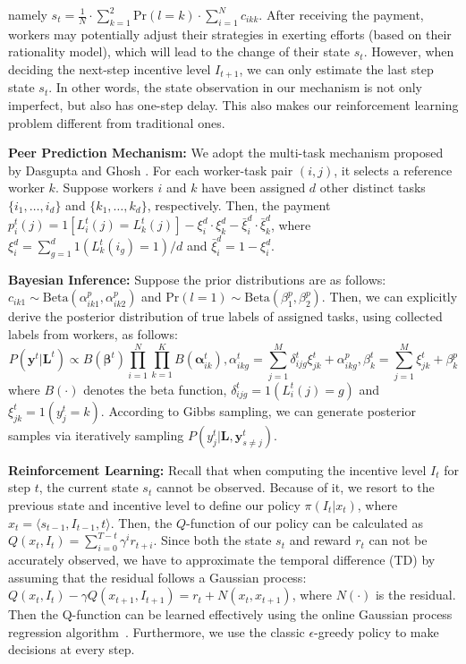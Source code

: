 \documentclass{article}
\begin{document}
namely $s_t =\frac{1}{N}\cdot \sum_{k=1}^2\textrm{Pr}(l=k)\cdot  \sum_{i=1}^{N}c_{ikk}$.
After receiving the payment, workers may potentially adjust their strategies in exerting efforts (based on their rationality model), which will lead to the change of their state $s_t$.
However, when deciding the next-step incentive level $I_{t+1}$, we can only estimate the last step state $s_t$.
In other words, the state observation in our mechanism is not only imperfect, but also has one-step delay. This also makes our reinforcement learning problem different from traditional ones.

\noindent \textbf{Peer Prediction Mechanism:} We adopt the multi-task mechanism proposed by Dasgupta and Ghosh \cite{dasgupta2013crowdsourced}.  For each worker-task pair $(i, j)$, it selects a reference worker $k$. Suppose workers $i$ and $k$ have been assigned $d$ other distinct tasks $\{i_1,\ldots,i_d\}$ and $\{k_1,\ldots, k_d\}$, respectively. Then, the payment $p^t_{i}(j)= 1[L^{t}_i(j)=L^{t}_k(j)]- \xi_{i}^d\cdot \xi_{k}^d -\bar{\xi}_{i}^d\cdot \bar{\xi}_{k}^d$, where $\xi_{i}^{d}=\sum_{g=1}^{d}1(L^{t}_k(i_g)=1)/d$ and $\bar{\xi}_{i}^{d}=1-\xi_{i}^{d}$.

\noindent \textbf{Bayesian Inference:} Suppose the prior distributions are as follows: $c_{ik1}\sim \textrm{Beta}(\alpha^{p}_{ik1},\alpha^{p}_{ik2})$ and $\textrm{Pr}(l=1)\sim \textrm{Beta}(\beta^{p}_{1},\beta^{p}_{2})$. Then, we can explicitly derive the posterior distribution of true labels of assigned tasks, using collected labels from workers, as follows:
\begin{equation}
\label{PostDist}
P(\bm{y}^{t}|\bm{L}^{t})\propto B(\bm{\beta}^{t}){\prod}_{i=1}^{N}{\prod}_{k=1}^{K} B(\bm{\alpha}^{t}_{ik}), \alpha^{t}_{ikg}={\sum}_{j=1}^{M}\delta^{t}_{ijg}\xi^{t}_{jk}+\alpha^{p}_{ikg}, \beta^{t}_k={\sum}_{j=1}^{M}\xi^{t}_{jk}+\beta^{p}_{k}
\end{equation}
where $B(\cdot)$ denotes the beta function, $\delta^{t}_{ijg}=1(L^t_i(j)=g)$ and $\xi^{t}_{jk}= 1(y^{t}_j=k)$. According to Gibbs sampling, we can generate posterior samples via iteratively sampling $P(y^{t}_j|\bm{L}, \bm{y}^t_{s\neq j})$.

\noindent \textbf{Reinforcement Learning:} Recall that when computing the incentive level $I_{t}$ for step $t$, the current state $s_{t}$ cannot be observed. Because of it, we resort to the previous state and incentive level to define our  policy $\pi(I_{t}|x_t)$, where $x_t=\langle s_{t-1}, I_{t-1}, t \rangle$.
Then, the $Q$-function of our policy can be calculated as $Q(x_t, I_t)= \sum_{i=0}^{T-t} \gamma^{i} r_{t+i}$.  %
Since both the state $s_t$ and reward $r_t$ can not be accurately observed, we have to approximate the temporal difference (TD) by assuming that the residual follows a Gaussian process: $Q(x_t, I_t) - \gamma Q(x_{t+1}, I_{t+1}) = r_t + N(x_t,x_{t+1})$, where $N(\cdot)$ is the residual. Then the Q-function can be learned effectively using the online Gaussian process regression algorithm~\cite{engel2005reinforcement}. Furthermore, we use the classic $\epsilon$-greedy policy to make decisions at every step.
\end{document}
